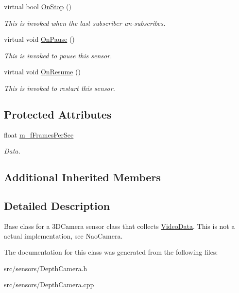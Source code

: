 \begin{DoxyCompactItemize}
virtual bool \hyperlink{class_depth_camera_a9a1f1276865887d32898f6e97dfaffea}{On\+Stop} ()
\begin{DoxyCompactList}\small\item\em This is invoked when the last subscriber un-\/subscribes. \end{DoxyCompactList}\item 
\mbox{\label{class_depth_camera_a1f4ab0e4b2393ad90f6bb4767cbad31c}} 
virtual void \hyperlink{class_depth_camera_a1f4ab0e4b2393ad90f6bb4767cbad31c}{On\+Pause} ()
\begin{DoxyCompactList}\small\item\em This is invoked to pause this sensor. \end{DoxyCompactList}\item 
\mbox{\label{class_depth_camera_aaf54e1c596148f5faa99b5c5dbf4daaa}} 
virtual void \hyperlink{class_depth_camera_aaf54e1c596148f5faa99b5c5dbf4daaa}{On\+Resume} ()
\begin{DoxyCompactList}\small\item\em This is invoked to restart this sensor. \end{DoxyCompactList}\end{DoxyCompactItemize}
\subsection*{Protected Attributes}
\begin{DoxyCompactItemize}
\item 
\mbox{\label{class_depth_camera_a333d874d5b7ec662da4955fd923a3329}} 
float \hyperlink{class_depth_camera_a333d874d5b7ec662da4955fd923a3329}{m\+\_\+f\+Frames\+Per\+Sec}
\begin{DoxyCompactList}\small\item\em Data. \end{DoxyCompactList}\end{DoxyCompactItemize}
\subsection*{Additional Inherited Members}


\subsection{Detailed Description}
Base class for a 3\+D\+Camera sensor class that collects \hyperlink{class_video_data}{Video\+Data}. This is not a actual implementation, see Nao\+Camera. 

The documentation for this class was generated from the following files\+:\begin{DoxyCompactItemize}
\item 
src/sensors/Depth\+Camera.\+h\item 
src/sensors/Depth\+Camera.\+cpp\end{DoxyCompactItemize}
